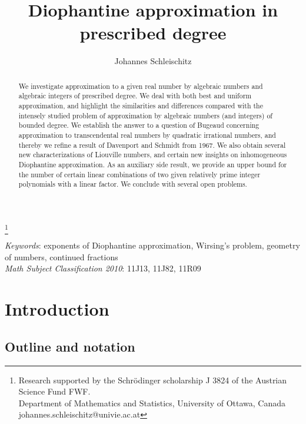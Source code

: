\documentclass[12pt]{amsart}
\theoremstyle{definition}
\begin{document}
	


\title[Diophantine approximation in prescribed degree]{Diophantine approximation in prescribed degree}


\author{Johannes Schleischitz}
                            
\thanks{Research supported by the Schr\"odinger scholarship J 3824 of the Austrian Science Fund FWF.\\
Department of Mathematics and Statistics, University of Ottawa, Canada  \\ 
johannes.schleischitz@univie.ac.at}                                                             
                            

\begin{abstract}
We investigate approximation to a given real number by algebraic numbers and algebraic integers of prescribed degree. 
We deal with both best and uniform approximation,
and highlight the similarities and differences compared
with the intensely studied problem of approximation by algebraic
numbers (and integers) of bounded degree. We
establish the answer to a question of Bugeaud concerning approximation
to transcendental real numbers by quadratic irrational numbers, and  
thereby we refine a result of Davenport and Schmidt from 1967.
We also obtain several new characterizations of Liouville numbers, 
and certain new insights
on inhomogeneous Diophantine approximation. As an auxiliary side result,
we provide an upper bound for the number of 
certain linear combinations of two given
relatively prime integer polynomials with a linear factor.
We conclude with several open problems.
\end{abstract}

\maketitle


{\footnotesize{
{\em Keywords}: exponents of Diophantine approximation, Wirsing's problem, geometry of numbers, continued fractions \\
{\em Math Subject Classification 2010}: 11J13, 11J82, 11R09}}



\section{Introduction}

\subsection{Outline and notation}  \label{out}
\end{document}
